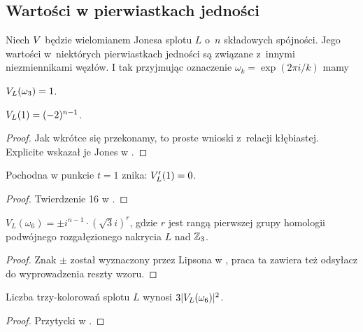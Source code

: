 
\subsection{Wartości w pierwiastkach jedności}
Niech $V$ będzie wielomianem Jonesa splotu $L$ o~$n$ składowych spójności.
Jego wartości w~niektórych pierwiastkach jedności są związane z~innymi niezmiennikami węzłów.
I tak przyjmując oznaczenie $\omega_k = \exp(2\pi i/k)$ mamy

\begin{proposition}
    \label{prp:jones_at_roots_of_unity}
    $V_L(\omega_3) = 1$.
\end{proposition}

\begin{proposition}
    $V_L(1) = (-2)^{n-1}$.
\end{proposition}

\begin{proof}
%
    Jak wkrótce się przekonamy, to proste wnioski z~relacji kłębiastej.
    Explicite wskazał je Jones w \cite[twierdzenie 14, 15]{jones85}.
\end{proof}

\begin{proposition}
    Pochodna w punkcie $t = 1$ znika: $V'_L(1) = 0$.
\end{proposition}

\begin{proof}
    Twierdzenie 16 w \cite{jones85}.
\end{proof}

\begin{proposition}
    $V_L(\omega_6) = \pm i^{n-1} \cdot (\sqrt 3i)^r$, gdzie $r$ jest rangą pierwszej grupy homologii podwójnego rozgałęzionego nakrycia $L$ nad $\mathbb Z_3$.
\end{proposition}

\begin{proof}
%
    Znak $\pm$ został wyznaczony przez Lipsona w \cite{lipson86}, praca ta zawiera też odsyłacz do wyprowadzenia reszty wzoru.
\end{proof}

\begin{proposition}
    Liczba trzy-kolorowań splotu $L$ wynosi $3|V_L(\omega_6)|^2$.
\end{proposition}

\begin{proof}
%
    Przytycki w \cite{przytycki98}.
\end{proof}

